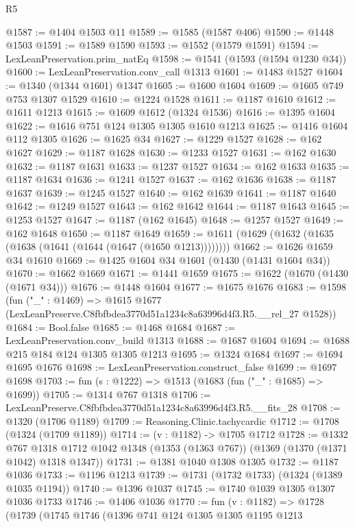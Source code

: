 \begin{lexlean}{R5}
\begin{coremodule}
@1587 := @1404 @1503 @11
@1589 := @1585 (@1587 @406)
@1590 := @1448 @1503
@1591 := @1589 @1590
@1593 := @1552 (@1579 @1591)
@1594 := LexLeanPreservation.prim_natEq
@1598 := @1541 (@1593 (@1594 @1230 @34))
@1600 := LexLeanPreservation.conv_call @1313
@1601 := @1483 @1527
@1604 := @1340 (@1344 @1601) @1347
@1605 := @1600 @1604
@1609 := @1605 @749 @753 @1307 @1529
@1610 := @1224 @1528
@1611 := @1187 @1610
@1612 := @1611 @1213
@1615 := @1609 @1612 (@1324 @1536)
@1616 := @1395 @1604
@1622 := @1616 @751 @124 @1305 @1305 @1610 @1213
@1625 := @1416 @1604 @112 @1305
@1626 := @1625 @34
@1627 := @1229 @1527
@1628 := @162 @1627
@1629 := @1187 @1628
@1630 := @1233 @1527
@1631 := @162 @1630
@1632 := @1187 @1631
@1633 := @1237 @1527
@1634 := @162 @1633
@1635 := @1187 @1634
@1636 := @1241 @1527
@1637 := @162 @1636
@1638 := @1187 @1637
@1639 := @1245 @1527
@1640 := @162 @1639
@1641 := @1187 @1640
@1642 := @1249 @1527
@1643 := @162 @1642
@1644 := @1187 @1643
@1645 := @1253 @1527
@1647 := @1187 (@162 @1645)
@1648 := @1257 @1527
@1649 := @162 @1648
@1650 := @1187 @1649
@1659 := @1611 (@1629 (@1632 (@1635 (@1638 (@1641 (@1644 (@1647 (@1650 @1213))))))))
@1662 := @1626 @1659 @34 @1610
@1669 := @1425 @1604 @34 @1601 (@1430 (@1431 @1604 @34))
@1670 := @1662 @1669
@1671 := @1441 @1659
@1675 := @1622 (@1670 (@1430 (@1671 @34)))
@1676 := @1448 @1604
@1677 := @1675 @1676
@1683 := @1598
    (fun ("_" : @1469) =>
    @1615 @1677 (LexLeanPreserve.C8fbfbdea3770d51a1234c8a63996d4f3.R5.__rel_27 @1528))
@1684 := Bool.false
@1685 := @1468 @1684
@1687 := LexLeanPreservation.conv_build @1313
@1688 := @1687 @1604
@1694 := @1688 @215 @184 @124 @1305 @1305 @1213
@1695 := @1324 @1684
@1697 := @1694 @1695 @1676
@1698 := LexLeanPreservation.construct_false
@1699 := @1697 @1698
@1703 := fun (s : @1222) => @1513 (@1683 (fun ("_" : @1685) => @1699))
@1705 := @1314 @767 @1318
@1706 := LexLeanPreserve.C8fbfbdea3770d51a1234c8a63996d4f3.R5.__fits_28
@1708 := @1320 (@1706 @1189)
@1709 := Reasoning.Clinic.tachycardic
@1712 := @1708 (@1324 (@1709 @1189))
@1714 := (v : @1182) -> @1705 @1712
@1728 := @1332
    @767
    @1318
    @1712
    @1042
    @1348
    (@1353 (@1363 @767))
    (@1369 (@1370 (@1371 @1042) @1318 @1347))
@1731 := @1381 @1040 @1308 @1305
@1732 := @1187 @1036
@1733 := @1196 @1213
@1739 := @1731 (@1732 @1733) (@1324 (@1389 @1035 @1194))
@1740 := @1396 @1037
@1745 := @1740 @1039 @1305 @1307 @1036 @1733
@1746 := @1406 @1036
@1770 := fun (v : @1182) =>
  @1728
    (@1739
      (@1745
        @1746
        (@1396
          @741
          @124
          @1305
          @1305
          @1195
          @1213

\end{coremodule}
\end{lexlean}
